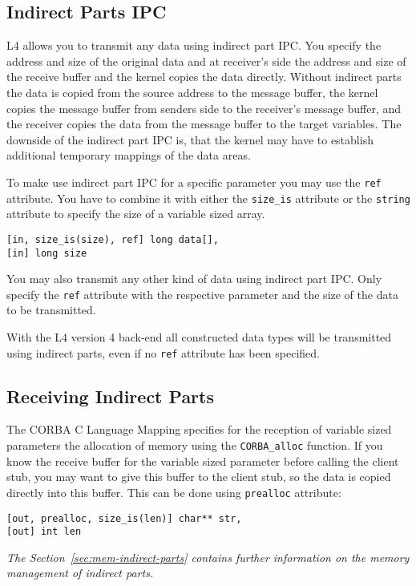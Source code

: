 \subsection{Indirect Parts IPC}
L4 allows you to transmit any data using 
indirect part IPC. You specify the address and size 
of the original data and at receiver's side the address and 
size of the receive buffer and the kernel copies the data
directly. Without indirect parts the data is copied from the
source address to the message buffer, the kernel copies the message buffer
from senders side to the receiver's message buffer,
and the receiver copies the data from the message buffer to the target variables.
The downside of the indirect part IPC is, that the
kernel may have to establish additional temporary mappings 
of the data areas.

To make \dice{} use indirect part IPC for a specific parameter
you may use the \verb|ref| attribute. You have to combine it
with either the \verb|size_is| attribute or the \verb|string| attribute
to specify the size of a variable sized array.

\begin{verbatim}
[in, size_is(size), ref] long data[],
[in] long size
\end{verbatim}

You may also transmit any other kind of data using indirect 
part IPC. Only specify the \verb|ref| attribute with the respective
parameter and the size of the data to be transmitted. 

With the L4 version 4 back-end all constructed data types will be
transmitted using indirect parts, even if no \verb|ref| attribute 
has been specified.

\subsection{Receiving Indirect Parts}
The CORBA C Language Mapping specifies for the reception of variable sized
parameters the allocation of memory using the \verb|CORBA_alloc| function.
If you know the receive buffer for the variable sized parameter before
calling the client stub, you may want to give this buffer to the client
stub, so the data is copied directly into this buffer. This can be done
using \verb|prealloc| attribute:
\begin{verbatim}
[out, prealloc, size_is(len)] char** str,
[out] int len
\end{verbatim}

{\em The Section~\ref{sec:mem-indirect-parts} contains further information
on the memory management of indirect parts.}

